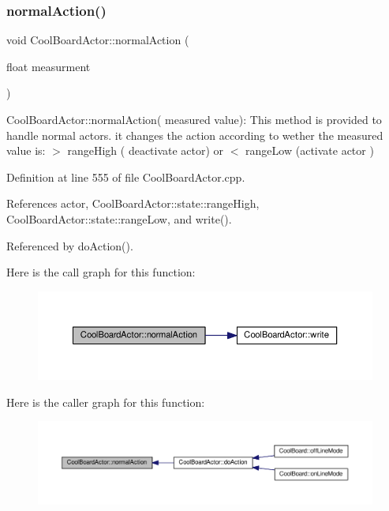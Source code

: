 \subsubsection{\texorpdfstring{normal\+Action()}{normalAction()}}
{\footnotesize\ttfamily void Cool\+Board\+Actor\+::normal\+Action (\begin{DoxyParamCaption}\item[{float}]{measurment }\end{DoxyParamCaption})}

Cool\+Board\+Actor\+::normal\+Action( measured value)\+: This method is provided to handle normal actors. it changes the action according to wether the measured value is\+: $>$ range\+High ( deactivate actor) or $<$ range\+Low (activate actor ) 

Definition at line 555 of file Cool\+Board\+Actor.\+cpp.



References actor, Cool\+Board\+Actor\+::state\+::range\+High, Cool\+Board\+Actor\+::state\+::range\+Low, and write().



Referenced by do\+Action().

Here is the call graph for this function\+:\nopagebreak
\begin{figure}[H]
\begin{center}
\leavevmode
\includegraphics[width=350pt]{dc/d69/class_cool_board_actor_a81229abf5895f4d3b0355050b822b438_cgraph}
\end{center}
\end{figure}
Here is the caller graph for this function\+:\nopagebreak
\begin{figure}[H]
\begin{center}
\leavevmode
\includegraphics[width=350pt]{dc/d69/class_cool_board_actor_a81229abf5895f4d3b0355050b822b438_icgraph}
\end{center}
\end{figure}
\mbox{\label{class_cool_board_actor_aae82b2e62f91be009d40f93c206f9bda}} 
